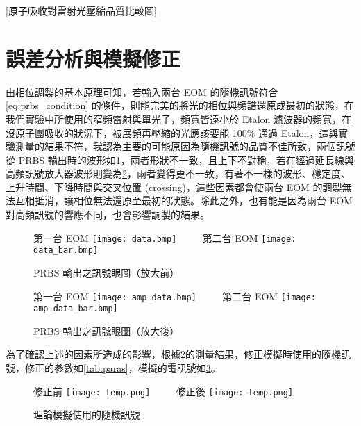 \documentclass[class=NCU_thesis, crop=false]{standalone}
\begin{document}
[原子吸收對雷射光壓縮品質比較圖]

\section{誤差分析與模擬修正}

由相位調製的基本原理可知，若輸入兩台 EOM 的隨機訊號符合\cref{eq:prbs_condition} 的條件，則能完美的將光的相位與頻譜還原成最初的狀態，在我們實驗中所使用的窄頻雷射與單光子，頻寬皆遠小於 Etalon 濾波器的頻寬，在沒原子團吸收的狀況下，被展頻再壓縮的光應該要能 100\% 通過 Etalon，這與實驗測量的結果不符，我認為主要的可能原因為隨機訊號的品質不佳所致，兩個訊號從 PRBS 輸出時的波形如\cref{fig:prbs_eye_}，兩者形狀不一致，且上下不對稱，若在經過延長線與高頻訊號放大器波形則變為\cref{fig:amp_prbs_eye}，兩者變得更不一致，有著不一樣的波形、穩定度、上升時間、下降時間與交叉位置 (crossing)，這些因素都會使兩台 EOM 的調製無法互相抵消，讓相位無法還原至最初的狀態。除此之外，也有能是因為兩台 EOM 對高頻訊號的響應不同，也會影響調製的結果。

\begin{figure}[!hbt]
    \centering
    \subcaptionbox
        {第一台 EOM
        \label{fig:subfig_fig1}}
        {\texttt{[image: data.bmp]}}
    ~~~~
    \subcaptionbox
        {第二台 EOM
        \label{fig:subfig_fig2}}
        {\texttt{[image: data\_bar.bmp]}}
    \caption{PRBS 輸出之訊號眼圖（放大前）}
    \label{fig:prbs_eye_}
\end{figure}

\begin{figure}[!hbt]
    \centering
    \subcaptionbox
        {第一台 EOM
        \label{fig:subfig_fig1}}
        {\texttt{[image: amp\_data.bmp]}}
    ~~~~
    \subcaptionbox
        {第二台 EOM
        \label{fig:subfig_fig2}}
        {\texttt{[image: amp\_data\_bar.bmp]}}
    \caption{PRBS 輸出之訊號眼圖（放大後）}
    \label{fig:amp_prbs_eye}
\end{figure}

為了確認上述的因素所造成的影響，根據\cref{fig:amp_prbs_eye}的測量結果，修正模擬時使用的隨機訊號，修正的參數如\cref{tab:paras}，模擬的電訊號如\cref{fig:modify_or_not}。

\begin{figure}[!hbt]
    \centering
    \subcaptionbox
        {修正前
        \label{fig:subfig_fig1}}
        {\texttt{[image: temp.png]}}
    ~~~~
    \subcaptionbox
        {修正後
        \label{fig:subfig_fig2}}
        {\texttt{[image: temp.png]}}
    \caption{理論模擬使用的隨機訊號}
    \label{fig:modify_or_not}
\end{figure}
\end{document}
